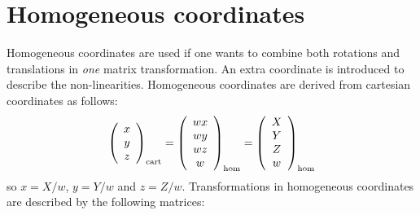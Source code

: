 \section{Homogeneous coordinates}
Homogeneous coordinates are used if one wants to combine both rotations and
translations in {\it one} matrix transformation. An extra coordinate is
introduced to describe the non-linearities. Homogeneous coordinates are derived
from cartesian coordinates as follows:
\[
\left(\begin{array}{c}x\\ y\\ z\end{array}\right)_{\rm cart}=
\left(\begin{array}{c}wx\\ wy\\ wz\\ w\end{array}\right)_{\rm hom}=
\left(\begin{array}{c}X\\ Y\\ Z\\ w\end{array}\right)_{\rm hom}
\]
so $x=X/w$, $y=Y/w$ and $z=Z/w$. Transformations in homogeneous coordinates
are described by the following matrices:
